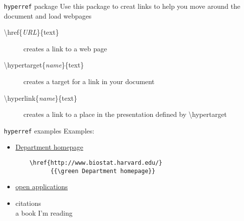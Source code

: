 \documentclass[ps,eliz,slideColor,nocolorBG,accumulate]{prosper}
\begin{document}

\begin{slide}{\texttt{hyperref} package}
Use this package to creat links to help you move around the document and load webpages
\begin{description}
\item [\textbackslash href\{\textit{URL}\}\{text\}] creates a link to a web page
\item [\textbackslash hypertarget\{\textit{name}\}\{text\}] creates a target for a link in your document
\item [\textbackslash hyperlink\{\textit{name}\}\{text\}] creates a link to a place in the presentation defined by \textbackslash hypertarget
\end{description}
\end{slide}
\begin{slide}{\texttt{hyperref} examples}
Examples:
  \begin{itemize}
  \item 
    \href{http://www.biostat.harvard.edu/}{{\green Department homepage}}
\tiny \begin{verbatim}
    \href{http://www.biostat.harvard.edu/}
          {{\green Department homepage}}
\end{verbatim}
\normalsize
\item 
\href{http://hsph-dl.harvard.edu:8080/ramgen/lecture16/trainer.rm}{{\green open applications}}
\item citations\\
a book I'm reading~\cite{garland}
  \end{itemize}

\end{slide}
\end{document}
